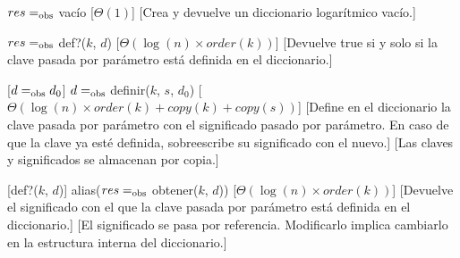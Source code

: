 \begin{Interfaz}
  
  \begin{paramFormales}
    \paramGeneros{$\kappa$, $\sigma$}




  \end{paramFormales}


  \generos{\tipo{\diccLogKS}}


    {$res =_{\mathrm{obs}}$ vac\'io}
    [$\Theta(1)$]
    [Crea y devuelve un diccionario logar\'itmico vac\'io.]

    {$res =_{\mathrm{obs}}$ def?($k$, $d$)}
    [$\Theta(\log(n) \times order(k))$]
    [Devuelve true si y solo si la clave pasada por par\'ametro est\'a definida en el diccionario.]

    [$d =_{\mathrm{obs}} d_0$]
    {$d =_{\mathrm{obs}}$ definir($k$, $s$, $d_0$)}
    [$\Theta(\log(n) \times order(k) + copy(k) + copy(s))$]
    [Define en el diccionario la clave pasada por par\'ametro con el significado pasado por par\'ametro. En caso de que la clave ya est\'e definida, sobreescribe su significado con el nuevo.]
    [Las claves y significados se almacenan por copia.]

    [def?($k$, $d$)]
    {alias($res =_{\mathrm{obs}}$ obtener($k$, $d$))}
    [$\Theta(\log(n) \times order(k))$]
    [Devuelve el significado con el que la clave pasada por par\'ametro est\'a definida en el diccionario.]
    [El significado se pasa por referencia. Modificarlo implica cambiarlo en la estructura interna del diccionario.]


\end{Interfaz}
